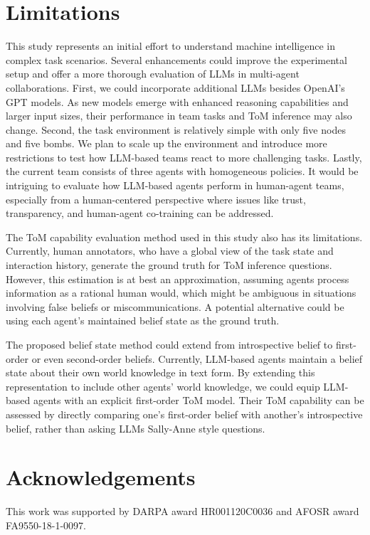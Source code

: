 \documentclass[11pt]{article}
\begin{document}
\section*{Limitations}
This study represents an initial effort to understand machine intelligence in complex task scenarios. Several enhancements could improve the experimental setup and offer a more thorough evaluation of LLMs in multi-agent collaborations. First, we could incorporate additional LLMs besides OpenAI's GPT models. As new models emerge with enhanced reasoning capabilities and larger input sizes, their performance in team tasks and ToM inference may also change. Second, the task environment is relatively simple with only five nodes and five bombs. We plan to scale up the environment and introduce more restrictions to test how LLM-based teams react to more challenging tasks. Lastly, the current team consists of three agents with homogeneous policies. It would be intriguing to evaluate how LLM-based agents perform in human-agent teams, especially from a human-centered perspective where issues like trust, transparency, and human-agent co-training can be addressed.

The ToM capability evaluation method used in this study also has its limitations. Currently, human annotators, who have a global view of the task state and interaction history, generate the ground truth for ToM inference questions. However, this estimation is at best an approximation, assuming agents process information as a rational human would, which might be ambiguous in situations involving false beliefs or miscommunications. A potential alternative could be using each agent's maintained belief state as the ground truth. 

The proposed belief state method could extend from introspective belief to first-order or even second-order beliefs. Currently, LLM-based agents maintain a belief state about their own world knowledge in text form. By extending this representation to include other agents' world knowledge, we could equip LLM-based agents with an explicit first-order ToM model. Their ToM capability can be assessed by directly comparing one's first-order belief with another's introspective belief, rather than asking LLMs Sally-Anne style questions.

\section{Acknowledgements}
This work was supported by DARPA award HR001120C0036 and AFOSR award FA9550-18-1-0097.
\end{document}
